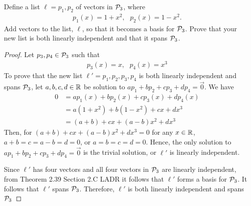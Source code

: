 \begin{question}
	\normalfont
	
	
	Define a list $\ell = p_1, p_2$ \hspace{.1cm}of vectors in $\P_3$, where
	\begin{align*}
		p_1(x) = 1+x^2,\ \ \ 
		p_2(x) = 1-x^2.
	\end{align*}
	Add vectors to the list, $\ell$, so that it becomes a basis for $\P_3$.  Prove that your new list is both linearly independent and that it spans $\P_3$.
\end{question}

\begin{proof}
    \renewcommand{\qedsymbol}{$\blacksquare$}
    Let $p_3,p_4\in\P_3$ such that 
    \[
        \begin{aligned}
            p_3(x)=x,\ \ \
            p_4(x)=x^3
        \end{aligned}
    \]
    To prove that the new list $\ell'=p_1,p_2,p_3,p_4$ is both linearly independent and spans $\P_3$, let $a,b,c,d\in\R$ be solution to $ap_1+bp_2+cp_3+dp_4=\vec{0}$. We have 
    \[
        \begin{aligned}
            0 &= ap_1(x)+bp_2(x)+cp_3(x)+dp_4(x)\\
              &= a(1+x^2)+b(1-x^2)+cx+dx^3\\
              &= (a+b)+cx+(a-b)x^2+dx^3   
        \end{aligned}
    \]
    Then, for $(a+b)+cx+(a-b)x^2+dx^3=0$ for any $x\in\R$, $a+b=c=a-b=d=0$, or $a=b=c=d=0$. Hence, the only solution to $ap_1+bp_2+cp_3+dp_4=\vec{0}$ is the trivial solution, or $\ell'$ is linearly independent.

    Since $\ell'$ has four vectors and all four vectors in $\P_3$ are linearly independent, from Theorem 2.39 Section 2.C LADR it follows that $\ell'$ forms a basis for $\P_3$. It follows that $\ell'$ spans $\P_3$.
    Therefore, $\ell'$ is both linearly independent and spans $\P_3$
\end{proof}
